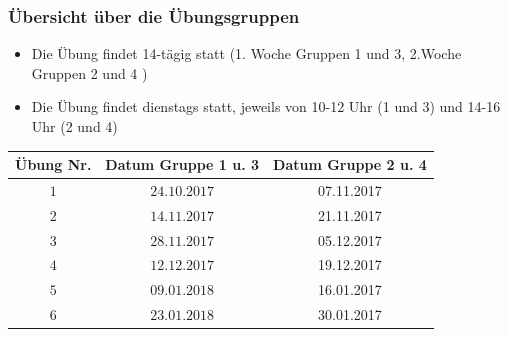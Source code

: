 \documentclass[usenames,dvipsnames,handout]{beamer}
\begin{document}
\begin{frame}
 \frametitle{Übersicht über die Übungsgruppen }%
 \begin{itemize}
 \item{Die Übung findet 14-tägig statt (1. Woche Gruppen 1 und 3, 2.Woche Gruppen 2 und 4 )}
 \item{Die Übung findet dienstags statt, jeweils von 10-12 Uhr (1 und 3) und 14-16 Uhr (2 und 4)}
 \end{itemize}
    \begin{table}
\begin{center}
 \begin{tabular}{|c|c|c|}
    \hline
   Übung Nr.    &    Datum Gruppe   1 u. 3 &  Datum  Gruppe  2 u. 4      \\ \hline
    $1$   &   $24.10.2017$   &  07.11.2017         \\ \hline
    $2$   &   $14.11.2017$   &  21.11.2017          \\ \hline
    $3$   &   $28.11.2017$   &  05.12.2017         \\ \hline
    $4$   &   $12.12.2017$   &  19.12.2017         \\ \hline
    $5$   &   $09.01.2018$   & 16.01.2017           \\ \hline
    $6$   &   $23.01.2018$   & 30.01.2017           \\ \hline
  \end{tabular}
  \end{center}
  \label{tab:multicol}
  \end{table}
\end{frame}
\end{document}
